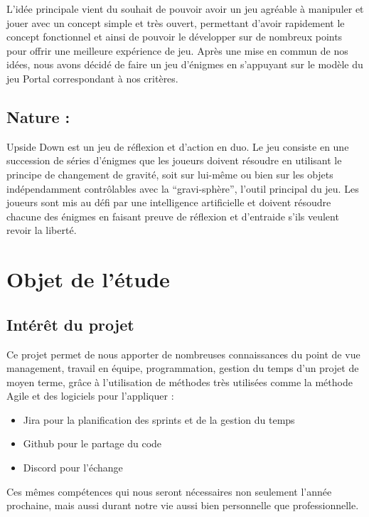 \documentclass[a4paper,11pt]{article}
\begin{document}
	L’idée principale vient du souhait de pouvoir avoir un jeu agréable à manipuler 
    et jouer avec un concept simple et très ouvert, permettant d’avoir rapidement le concept fonctionnel et ainsi de pouvoir le développer sur de nombreux points pour offrir une meilleure expérience de jeu. Après une mise en commun de nos idées, nous avons décidé de faire un jeu d’énigmes en s’appuyant sur le modèle du jeu Portal correspondant à nos critères.	

    \subsection{Nature :}
	Upside Down est un jeu de réflexion et d'action en duo.
Le jeu consiste en une succession de séries d'énigmes que les joueurs doivent 
résoudre en utilisant le principe de changement de gravité, soit sur lui-même ou bien sur les objets indépendamment contrôlables avec la “gravi-sphère”, l’outil principal du jeu. Les joueurs sont mis au défi par une intelligence artificielle et doivent résoudre chacune des énigmes en faisant preuve de réflexion et d'entraide s'ils veulent revoir la liberté.

\section{Objet de l’étude}

\subsection{Intérêt du projet}
Ce projet permet de nous apporter de nombreuses connaissances du point de vue management, 
travail en équipe, programmation, gestion du temps d’un projet de moyen terme, 
grâce à l’utilisation de méthodes très utilisées comme la méthode Agile et des logiciels pour l’appliquer : \newline

\begin{itemize}
    \item Jira pour la planification des sprints et de la gestion du temps
    \item Github pour le partage du code
    \item Discord pour l’échange\newline
\end{itemize}

Ces mêmes compétences qui nous seront nécessaires non seulement 
l’année prochaine, mais aussi durant notre vie aussi bien personnelle que professionnelle.
\end{document}

